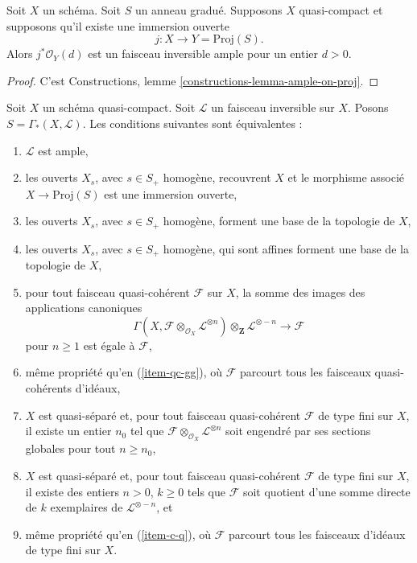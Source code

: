 \begin{lemma}
\label{lemma-open-in-proj-ample}
Soit $X$ un schéma.
Soit $S$ un anneau gradué. Supposons $X$ quasi-compact et
supposons qu'il existe une immersion ouverte
$$
j : X \longrightarrow Y = \text{Proj}(S).
$$
Alors $j^*\mathcal{O}_Y(d)$ est un faisceau inversible ample pour
un entier $d > 0$.
\end{lemma}

\begin{proof}
C'est Constructions, lemme \ref{constructions-lemma-ample-on-proj}.
\end{proof}

\begin{proposition}
\label{proposition-characterize-ample}
Soit $X$ un schéma quasi-compact.
Soit $\mathcal{L}$ un faisceau inversible sur $X$.
Posons $S = \Gamma_*(X, \mathcal{L})$.
Les conditions suivantes sont équivalentes :
\begin{enumerate}
\item
\label{item-ample}
$\mathcal{L}$ est ample,
\item
\label{item-immersion}
les ouverts $X_s$, avec $s \in S_{+}$ homogène,
recouvrent $X$ et le morphisme associé $X \to \text{Proj}(S)$
est une immersion ouverte,
\item
\label{item-s-basis}
les ouverts $X_s$, avec $s \in S_{+}$ homogène,
forment une base de la topologie de $X$,
\item
\label{item-s-affine-basis}
les ouverts $X_s$, avec $s \in S_{+}$ homogène,
qui sont affines forment une base de la topologie de $X$,
\item
\label{item-qc-gg}
pour tout faisceau quasi-cohérent $\mathcal{F}$ sur $X$,
la somme des images des applications canoniques
$$
\Gamma(X, \mathcal{F} \otimes_{\mathcal{O}_X} \mathcal{L}^{\otimes n})
\otimes_{\mathbf{Z}} \mathcal{L}^{\otimes -n}
\longrightarrow
\mathcal{F}
$$
pour $n \geq 1$ est égale à $\mathcal{F}$,
\item
\label{item-qc-i-gg}
même propriété qu'en (\ref{item-qc-gg}), où $\mathcal{F}$
parcourt tous les faisceaux quasi-cohérents d'idéaux,
\item
\label{item-c-gg}
$X$ est quasi-séparé et,
pour tout faisceau quasi-cohérent $\mathcal{F}$ de type fini sur $X$,
il existe un entier $n_0$ tel que
$\mathcal{F} \otimes_{\mathcal{O}_X} \mathcal{L}^{\otimes n}$
soit engendré par ses sections globales pour tout $n \geq n_0$,
\item
\label{item-c-q}
$X$ est quasi-séparé et,
pour tout faisceau quasi-cohérent $\mathcal{F}$ de type fini sur $X$,
il existe des entiers $n > 0$, $k \geq 0$ tels que
$\mathcal{F}$ soit quotient d'une somme directe de $k$ exemplaires de
$\mathcal{L}^{\otimes - n}$, et
\item
\label{item-c-i-q}
même propriété qu'en (\ref{item-c-q}), où $\mathcal{F}$ parcourt tous les
faisceaux d'idéaux de type fini sur $X$.
\end{enumerate}
\end{proposition}

